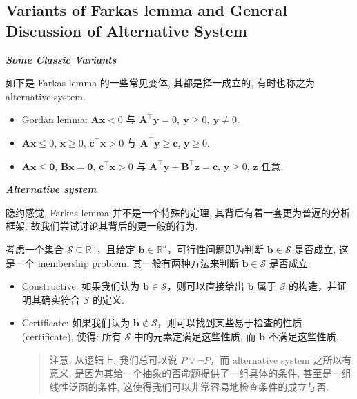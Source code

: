 \subsection{Variants of Farkas lemma and General Discussion of Alternative System}

\emph{\textbf{Some Classic Variants}}


\begin{propositionblock}
如下是 Farkas lemma 的一些常见变体, 其都是择一成立的, 有时也称之为 alternative system.

\begin{itemize}
\item {}Gordan lemma: $\bm{A}\bm{x} < 0$ $\text{与}$ $\bm{A}^\top \bm{y} = 0,~ \bm{y} \geq 0,~ \bm{y} \neq 0$.


\item {}$\bm{A}\bm{x} \leq 0$, $\bm{x} \geq 0$, $\bm{c}^\top \bm{x} > 0$ $\text{与}$ $\bm{A}^\top \bm{y} \geq \bm{c}$, $\bm{y} \geq 0$.


\item {}$\bm{A}\bm{x} \leq \bm{0}$, $\bm{B}\bm{x} = \bm{0}$, $\bm{c}^\top \bm{x} > 0$ $\text{与}$ $\bm{A}^\top \bm{y} + \bm{B}^\top \bm{z} = \bm{c}$, $\bm{y} \geq 0$, $\bm{z}$ 任意.


\end{itemize}

\end{propositionblock}

\emph{\textbf{Alternative system}}

隐约感觉, Farkas lemma 并不是一个特殊的定理, 其背后有着一套更为普遍的分析框架. 故我们尝试讨论其背后的更一般的行为.

考虑一个集合 $\mathcal{S} \subseteq \mathbb{R}^n$，且给定 $\bm{b} \in \mathbb{R}^n$，可行性问题即为判断 $\bm{b} \in \mathcal{S}$ 是否成立, 这是一个 membership problem. 其一般有两种方法来判断 $\bm{b} \in \mathcal{S}$ 是否成立:

\begin{itemize}
\item {}Constructive: 如果我们认为 $\bm{b} \in \mathcal{S}$，则可以直接给出 $\bm{b}$ 属于 $\mathcal{S}$ 的构造，并证明其确实符合 $\mathcal{S}$ 的定义.


\item {}Certificate: 如果我们认为 $\bm{b} \notin \mathcal{S}$，则可以找到某些易于检查的性质 (certificate), 使得: 所有 $\mathcal{S}$ 中的元素定满足这些性质, 而 $\bm{b}$ 不满足这些性质.

\begin{quote}
注意, 从逻辑上, 我们总可以说 $P \lor \neg P$，而 alternative system 之所以有意义, 是因为其给一个抽象的否命题提供了一组具体的条件, 甚至是一组线性泛函的条件, 这使得我们可以非常容易地检查条件的成立与否.

\end{quote}


\end{itemize}

